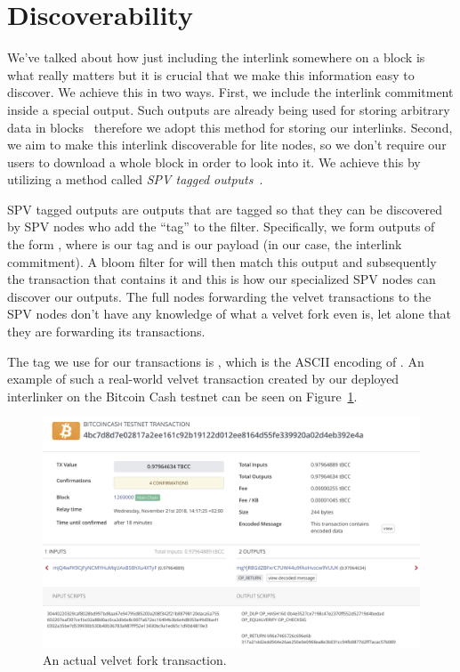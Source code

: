\section{Discoverability}
We've talked about how just including the interlink somewhere on a block is what really matters but it is crucial that we make this information easy to discover. We achieve this in two ways. First, we include the interlink commitment inside a special  output. Such outputs are already being used for storing arbitrary data in blocks~\cite{arbitrary-data} therefore we adopt this method for storing our interlinks. Second, we aim to make this interlink discoverable for lite nodes, so we don't require our users to download a whole block in order to look into it. We achieve this by utilizing a method called \emph{SPV tagged outputs}~\cite{spv-tagged}.

SPV tagged outputs are outputs that are tagged so that they can be discovered by SPV nodes who add the ``tag'' to the filter. Specifically, we form outputs of the form , where  is our tag and  is our payload (in our case, the interlink commitment). A bloom filter for  will then match this output and subsequently the transaction that contains it and this is how our specialized SPV nodes can discover our outputs. The full nodes forwarding the velvet transactions to the SPV nodes don't have any knowledge of what a velvet fork even is, let alone that they are forwarding its transactions.

The tag we use for our transactions is , which is the ASCII encoding of . An example of such a real-world velvet transaction created by our deployed interlinker on the Bitcoin Cash testnet can be seen on Figure~\ref{fig:actual-velvet-tx}.

\begin{figure}
  \centering
  \includegraphics[width=0.9\columnwidth,keepaspectratio]{figures/actual-velvet-tx.png}
  \caption{An actual velvet fork transaction.}
  \label{fig:actual-velvet-tx}
\end{figure}

